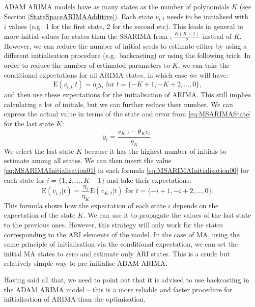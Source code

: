 \documentclass[]{book}
\theoremstyle{definition}
\theoremstyle{definition}
\theoremstyle{definition}
\theoremstyle{definition}
\theoremstyle{remark}
\begin{document}
ADAM ARIMA models have as many states as the number of polynomials \(K\) (see Section \ref{StateSpaceARIMAAdditive}). Each state \(v_{i,t}\) needs to be initialised with \(i\) values (e.g.~1 for the first state, 2 for the second etc). This leads in general to more initial values for states than the SSARIMA from \citet{Svetunkov2019}: \(\frac{K(K+1)}{2}\) instead of \(K\).
However, we can reduce the number of initial seeds to estimate either by using a different initialisation procedure (e.g.~backcasting) or using the following trick. In order to reduce the number of estimated parameters to \(K\), we can take the conditional expectations for all ARIMA states, in which case we will have:
\begin{equation}
  \mathrm{E}(v_{i,t} | t) = \eta_i y_{t} \text{ for } t=\{-K+1, -K+2, \dots, 0\},
  \label{eq:MSARIMAInitialisation00}
\end{equation}
and then use these expectations for the initialisation of ARIMA. This still implies calculating a lot of initials, but we can further reduce their number. We can express the actual value in terms of the state and error from \eqref{eq:MSARIMAState} for the last state \(K\):
\begin{equation}
  y_{t} = \frac{v_{K,t} -\theta_K \epsilon_{t}}{\eta_K}.
  \label{eq:MSARIMAInitialisation01}
\end{equation}
We select the last state \(K\) because it has the highest number of initials to estimate among all states. We can then insert the value \eqref{eq:MSARIMAInitialisation01} in each formula \eqref{eq:MSARIMAInitialisation00} for each state for \(i=\{1, 2, \dots, K-1\}\) and take their expectations:
\begin{equation}
  \mathrm{E}(v_{i,t}|t) = \frac{\eta_i}{\eta_K} \mathrm{E}(v_{K,t}|t)  \text{ for } t=\{-i+1, -i+2, \dots, 0\}.
  \label{eq:MSARIMAInitialisation02}
\end{equation}
This formula shows how the expectation of each state \(i\) depends on the expectation of the state \(K\). We can use it to propagate the values of the last state to the previous ones. However, this strategy will only work for the states corresponding to the ARI elements of the model. In the case of MA, using the same principle of initialisation via the conditional expectation, we can set the initial MA states to zero and estimate only ARI states. This is a crude but relatively simple way to pre-initialise ADAM ARIMA.

Having said all that, we need to point out that it is advised to use backcasting in the ADAM ARIMA model -- this is a more reliable and faster procedure for initialisation of ARIMA than the optimisation.
\end{document}
